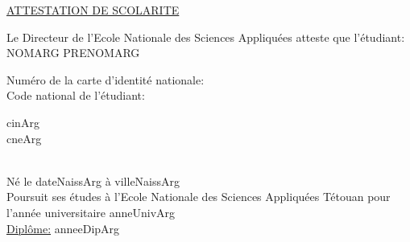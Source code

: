 \documentclass[a4paper, 20pt]{article}
\begin{document}
\thispagestyle{fancy}
\begin{center}
    \underline{\huge\uppercase{Attestation de scolarite}}
    \vspace{1.3em}\\
\end{center}

\large{   
\hspace{3em}
Le Directeur de l'Ecole Nationale des Sciences Appliqu\'ees atteste que l'\'etudiant:
\vspace{0.3em}\\

\hspace{3em}
\uppercase{nomArg prenomArg}
\vspace{0.3em}\\

\hspace{3em}
\begin{minipage}{0.4\textwidth}
    Num\'ero de la carte d'identit\'e nationale:
    \vspace{0.3em}\\
    Code national de l'\'etudiant:  
\end{minipage}
\hspace{0.03em}
\begin{minipage}{0.3\textwidth}
    cinArg
    \vspace{0.3em}\\
    cneArg
\end{minipage}
\vspace{0.3em}\\

\hspace{3em}
N\'e le dateNaissArg \`a villeNaissArg
\vspace{0.3em}\\

\hspace{3em}
Poursuit ses \'etudes \`a l'Ecole Nationale des Sciences Appliqu\'ees T\'etouan pour 
\vspace{-1em}\\

\hspace{3.2em}l'ann\'ee universitaire anneUnivArg
\vspace{0.3em}\\

\hspace{3em}
\underline{Dipl\^ome:} anneeDipArg
\vspace{0.3em}\\

}
\end{document}

